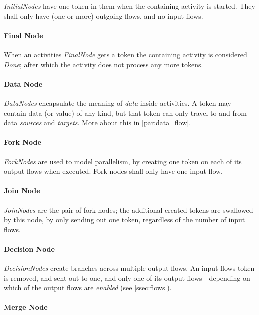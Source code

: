\emph{InitialNodes} have one token in them when the containing activity is started. They shall only have (one or more) outgoing flows, and no input flows. 

\paragraph{Final Node}

When an activities \emph{FinalNode} gets a token the containing activity is considered \emph{Done}; after which the activity does not process any more tokens.

\paragraph{Data Node}

\emph{DataNodes} encapsulate the meaning of \emph{data} inside activities. A token may contain data (or value) of any kind, but that token can only travel to and from data \emph{sources} and \emph{targets}. More about this in \autoref{par:data_flow}.

\paragraph{Fork Node}

\emph{ForkNodes} are used to model parallelism, by creating one token on each of its output flows when executed. Fork nodes shall only have one input flow.

\paragraph{Join Node}

\emph{JoinNodes} are the pair of fork nodes; the additional created tokens are swallowed by this node, by only sending out one token, regardless of the number of input flows.

\paragraph{Decision Node}

\emph{DecisionNodes} create branches across multiple output flows. An input flows token is removed, and sent out to one, and only one of its output flows - depending on which of the output flows are \emph{enabled} (see \autoref{ssec:flows}).

\paragraph{Merge Node}

